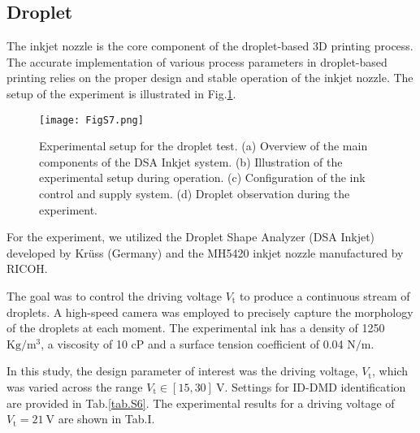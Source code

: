 \subsection{Droplet}
The inkjet nozzle is the core component of the droplet-based 3D printing process. The accurate implementation of various process parameters in droplet-based printing relies on the proper design and stable operation of the inkjet nozzle. The setup of the experiment is illustrated in Fig.\ref{S7}.

\begin{figure}[!ht]
  \centering
  \texttt{[image: FigS7.png]}
  \caption{
  Experimental setup for the droplet test. (a) Overview of the main components of the DSA Inkjet system. (b) Illustration of the experimental setup during operation. (c) Configuration of the ink control and supply system. (d) Droplet observation during the experiment.
  }
  \label{S7}
\end{figure}

For the experiment, we utilized the Droplet Shape Analyzer (DSA Inkjet) developed by Krüss (Germany) and the MH5420 inkjet nozzle manufactured by RICOH.

The goal was to control the driving voltage ${V}_\text{t}$ to produce a continuous stream of droplets. A high-speed camera was employed to precisely capture the morphology of the droplets at each moment. The experimental ink has a density of 1250 $\text{Kg/}{\text{m}^{3}}$, a viscosity of 10 cP and a surface tension coefficient of 0.04 $\text{N/m}$. 

In this study, the design parameter of interest was the driving voltage, ${V}_\text{t}$, which was varied across the range ${{V}_\text{t}}\in [15,30]\ \text{V}$. Settings for ID-DMD identification are provided in Tab.\ref{tab.S6}. The experimental results for a driving voltage of ${{V}_{\text{t}}}=21\ \text{V}$ are shown in Tab.I.

